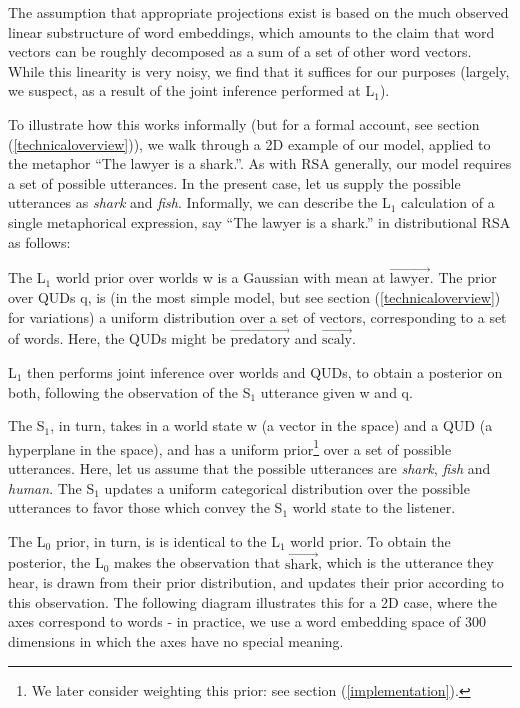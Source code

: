 \documentclass[10pt,letterpaper,twocolumn]{article}
\begin{document}
The assumption that appropriate projections exist is based on the much observed linear substructure of word embeddings, which amounts to the claim that word vectors can be roughly decomposed as a sum of a set of other word vectors. While this linearity is very noisy, we find that it suffices for our purposes (largely, we suspect, as a result of the joint inference performed at L$_1$).

To illustrate how this works informally (but for a formal account, see section (\ref{technicaloverview})), we walk through a 2D example of our model, applied to the metaphor ``The lawyer is a shark.''. As with RSA generally, our model requires a set of possible utterances. In the present case, let us supply the possible utterances as \emph{shark} and \emph{fish}. Informally, we can describe the L$_1$ calculation of a single metaphorical expression, say ``The lawyer is a shark.'' in distributional RSA as follows:

The L$_1$ world prior over worlds w is a Gaussian with mean at $\overrightarrow{\text{lawyer}}$. The prior over QUDs q, is (in the most simple model, but see section (\ref{technicaloverview}) for variations) a uniform distribution over a set of vectors, corresponding to a set of words. Here, the QUDs might be $\overrightarrow{\text{predatory}}$ and $\overrightarrow{\text{scaly}}$.

L$_1$ then performs joint inference over worlds and QUDs, to obtain a posterior on both, following the observation of the S$_1$ utterance given w and q.

The S$_1$, in turn, takes in a world state w (a vector in the space) and a QUD (a hyperplane in the space), and has a uniform prior\footnote{We later consider weighting this prior: see section (\ref{implementation}).} over a set of possible utterances. Here, let us assume that the possible utterances are \emph{shark}, \emph{fish} and \emph{human}. The S$_1$ updates a uniform categorical distribution over the possible utterances to favor those which convey the S$_1$ world state to the listener.


The L$_0$ prior, in turn, is is identical to the L$_1$ world prior. To obtain the posterior, the L$_0$ makes the observation that $\overrightarrow{\text{shark}}$, which is the utterance they hear, is drawn from their prior distribution, and updates their prior according to this observation. The following diagram illustrates this for a 2D case, where the axes correspond to words - in practice, we use a word embedding space of 300 dimensions in which the axes have no special meaning.
\end{document}
